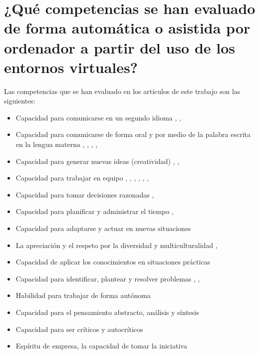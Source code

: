 \pagestyle{normal}
\section{¿Qué competencias se han evaluado de forma automática o asistida por ordenador a partir del uso de los entornos virtuales?}
Las competencias que se han evaluado en los artículos de este trabajo son las siguientes:
\begin{itemize}
\item Capacidad para comunicarse en un segundo idioma \cite{Shih:2011}, \cite{MercedesRico:2013}, \cite{Masip-Alvarez:2013}
\item Capacidad para comunicarse de forma oral y por medio de la palabra escrita en la lengua materna \cite{Mohamed:2008}, \cite{Piedra:2010}, \cite{Liao:2013}, \cite{Masip-Alvarez:2013}, \cite{Colomo-Palacios:2013}
\item Capacidad para generar nuevas ideas (creatividad) \cite{Piedra:2010}, \cite{Liao:2013}, \cite{Colomo-Palacios:2013}
\item Capacidad para trabajar en equipo \cite{McMahon:2007}, \cite{Mohamed:2008}, \cite{Rashid:2008}, \cite{Lim:2011}, \cite{Liao:2013}, \cite{Masip-Alvarez:2013}, \cite{Colomo-Palacios:2013}
\item Capacidad para tomar decisiones razonadas \cite{Achcaoucaou:2012}, \cite{Colomo-Palacios:2013}
\item Capacidad para planificar y administrar el tiempo \cite{Achcaoucaou:2012}, \cite{Liao:2013}
\item Capacidad para adaptarse y actuar en nuevas situaciones \cite{Liao:2013}
\item La apreciación y el respeto por la diversidad y multiculturalidad \cite{Liao:2013}, \cite{Colomo-Palacios:2013}
\item Capacidad de aplicar los conocimientos en situaciones prácticas \cite{Liao:2013}
\item Capacidad para identificar, plantear y resolver problemas \cite{Achcaoucaou:2012}, \cite{Guenaga:2013}, \cite{Colomo-Palacios:2013}
\item Habilidad para trabajar de forma autónoma \cite{Colomo-Palacios:2013}
\item Capacidad para el pensamiento abstracto, análisis y síntesis \cite{Colomo-Palacios:2013}
\item Capacidad para ser críticos y autocríticos \cite{Colomo-Palacios:2013}
\item Espíritu de empresa, la capacidad de tomar la iniciativa \cite{Colomo-Palacios:2013}
\end{itemize}

